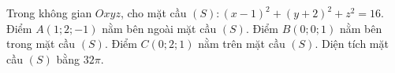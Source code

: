 \begin{ex}
Trong không gian $Oxyz$, cho mặt cầu $(S)\colon(x-1)^2+(y+2)^2+z^2=16$.
\choiceTF
{\True Điểm $A(1;2;-1)$ nằm bên ngoài mặt cầu $(S)$.}
{\True Điểm $B(0;0;1)$ nằm bên trong mặt cầu $(S)$.}
{Điểm $C(0;2;1)$ nằm trên mặt cầu $(S)$.}
{Diện tích mặt cầu $(S)$ bằng $32\pi$.}
\end{ex}
